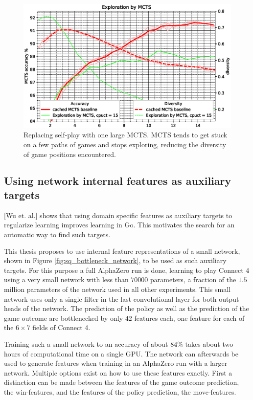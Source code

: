 \documentclass[12pt,onecolumn,oneside,titlepage]{article}
\begin{document}
\begin{figure}[H]
\centering
\includegraphics[clip,width=\columnwidth]{mcts_tree_explore}
\caption{Replacing self-play with one large MCTS. MCTS tends to get stuck on a few paths of games and stops exploring, reducing the diversity of game positions encountered.}
\label{fig:mcts_tree_explore}
\end{figure}


\subsection{Using network internal features as auxiliary targets}

\cite{wu2019accelerating}[Wu et. al.] shows that using domain specific features as auxiliary targets to regularize learning improves learning in Go. This motivates the search for an automatic way to find such targets.

This thesis proposes to use internal feature representations of a small network, shown in Figure \ref{fig:sq_bottleneck_network}, to be used as such auxiliary targets. For this purpose a full AlphaZero run is done, learning to play Connect 4 using a very small network with less than $70000$ 
parameters, a fraction of the $1.5$ million parameters of the network used in all other experiments. This small network uses only a single filter in the last convolutional layer for both output-heads of the network. The prediction of the policy as well as the prediction of the game outcome 
are bottlenecked by only $42$ features each, one feature for each of the $6 \times 7$ fields of Connect 4.

Training such a small network to an accuracy of about $84\%$ takes about two hours of computational time on a single GPU. The network can afterwards be used to generate features when training in an AlphaZero run with a larger network.
Multiple options exist on how to use these features exactly. First a distinction can be made between the features of the game outcome prediction, the win-features, and the features of the policy prediction, the move-features.
\end{document}
